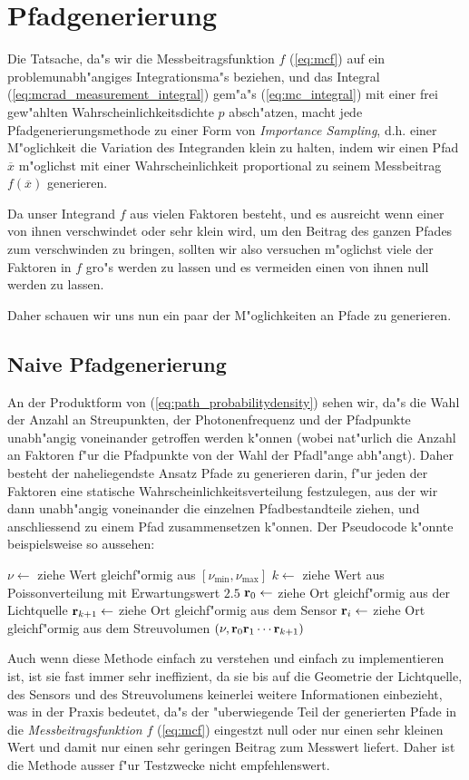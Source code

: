 	\section{Pfadgenerierung}
	Die Tatsache, da"s wir die Messbeitragsfunktion $f$ (\ref{eq:mcf}) auf ein problemunabh"angiges Integrationsma"s beziehen, und das Integral (\ref{eq:mcrad_measurement_integral}) gem"a"s (\ref{eq:mc_integral}) mit einer frei gew"ahlten Wahrscheinlichkeitsdichte $p$ absch"atzen, macht jede Pfadgenerierungsmethode zu einer Form von {\em Importance Sampling}, d.h. einer M"oglichkeit die Variation des Integranden klein zu halten, indem wir einen Pfad ${\overline x}$ m"oglichst mit einer Wahrscheinlichkeit proportional zu seinem Messbeitrag $f({\overline x})$ generieren.
	
	Da unser Integrand $f$ aus vielen Faktoren besteht, und es ausreicht wenn einer von ihnen verschwindet oder sehr klein wird, um den Beitrag des ganzen Pfades zum verschwinden zu bringen, sollten wir also versuchen m"oglichst viele der Faktoren in $f$ gro"s werden zu lassen und es vermeiden einen von ihnen null werden zu lassen.
	
	Daher schauen wir uns nun ein paar der M"oglichkeiten an Pfade zu generieren.
	\subsection{Naive Pfadgenerierung}
	An der Produktform von (\ref{eq:path_probabilitydensity}) sehen wir, da"s die Wahl der Anzahl an Streupunkten, der Photonenfrequenz und der Pfadpunkte unabh"angig voneinander getroffen werden k"onnen (wobei nat"urlich die Anzahl an Faktoren f"ur die Pfadpunkte von der Wahl der Pfadl"ange abh"angt). Daher besteht der naheliegendste Ansatz Pfade zu generieren darin, f"ur jeden der Faktoren eine statische Wahrscheinlichkeitsverteilung festzulegen, aus der wir dann unabh"angig voneinander die einzelnen Pfadbestandteile ziehen, und anschliessend zu einem Pfad zusammensetzen k"onnen. Der Pseudocode k"onnte beispielsweise so aussehen:
	\begin{algorithmic}
		\STATE $\nu \leftarrow$ ziehe Wert gleichf"ormig aus $[\nu_\text{min},\nu_\text{max}]$
		\STATE $k \leftarrow$ ziehe Wert aus Poissonverteilung mit Erwartungswert $2.5$
		\STATE $\mathbf{r}_0 \leftarrow$ ziehe Ort gleichf"ormig aus der Lichtquelle
		\STATE $\mathbf{r}_{k+1} \leftarrow$ ziehe Ort gleichf"ormig aus dem Sensor
			\STATE $\mathbf{r}_i \leftarrow$ ziehe Ort gleichf"ormig aus dem Streuvolumen
	  \ENDFOR
	  \RETURN $(\nu,\mathbf{r}_0\mathbf{r}_1\cdots\mathbf{r}_{k+1})$
	\end{algorithmic}
	Auch wenn diese Methode einfach zu verstehen und einfach zu implementieren ist, ist sie fast immer sehr ineffizient, da sie bis auf die Geometrie der Lichtquelle, des Sensors und des Streuvolumens keinerlei weitere Informationen einbezieht, was in der Praxis bedeutet, da"s der "uberwiegende Teil der generierten Pfade in die {\em Messbeitragsfunktion} $f$ (\ref{eq:mcf}) eingestzt null oder nur einen sehr kleinen Wert und damit nur einen sehr geringen Beitrag zum Messwert liefert. Daher ist die Methode ausser f"ur Testzwecke nicht empfehlenswert.
	

